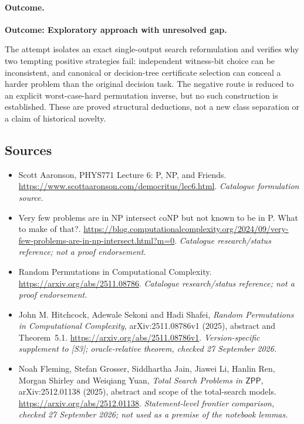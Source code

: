 \documentclass[11pt,a4paper]{article}
\numberwithin{equation}{section}
\begin{document}
\paragraph{Outcome.}
\textbf{Outcome: Exploratory approach with unresolved gap.}

The attempt isolates an exact single-output search reformulation and verifies
why two tempting positive strategies fail: independent witness-bit choice
can be inconsistent, and canonical or decision-tree certificate selection
can conceal a harder problem than the original decision task. The negative
route is reduced to an explicit worst-case-hard permutation inverse, but
no such construction is established. These are proved structural deductions,
not a new class separation or a claim of historical novelty.


\subsection{Sources}
\begin{itemize}\raggedright
\item[\textnormal{[S1]}]\hypertarget{source:statement:1}{} Scott Aaronson, PHYS771 Lecture 6: P, NP, and Friends.
\url{https://www.scottaaronson.com/democritus/lec6.html}.
{\small\textit{Catalogue formulation source.}}
\item[\textnormal{[S2]}]\hypertarget{source:statement:2}{} Very few problems are in NP intersect coNP but not known to be in P. What to make of that?.
\url{https://blog.computationalcomplexity.org/2024/09/very-few-problems-are-in-np-intersect.html?m=0}.
{\small\textit{Catalogue research/status reference; not a proof endorsement.}}
\item[\textnormal{[S3]}]\hypertarget{source:statement:3}{} Random Permutations in Computational Complexity.
\url{https://arxiv.org/abs/2511.08786}.
{\small\textit{Catalogue research/status reference; not a proof endorsement.}}
\item[\textnormal{[E1]}]\hypertarget{extra:statement:1}{} John M. Hitchcock,
Adewale Sekoni and Hadi Shafei, \emph{Random Permutations in Computational
Complexity}, arXiv:2511.08786v1 (2025), abstract and Theorem~5.1.
\url{https://arxiv.org/abs/2511.08786v1}.
{\small\textit{Version-specific supplement to [S3]; oracle-relative theorem,
checked 27 September 2026.}}
\item[\textnormal{[E2]}]\hypertarget{extra:statement:2}{} Noah Fleming, Stefan
Grosser, Siddhartha Jain, Jiawei Li, Hanlin Ren, Morgan Shirley and
Weiqiang Yuan, \emph{Total Search Problems in $\mathsf{ZPP}$},
arXiv:2512.01138 (2025), abstract and scope of the total-search models.
\url{https://arxiv.org/abs/2512.01138}.
{\small\textit{Statement-level frontier comparison, checked
27 September 2026; not used as a premise of the notebook lemmas.}}

\end{itemize}

\end{document}

